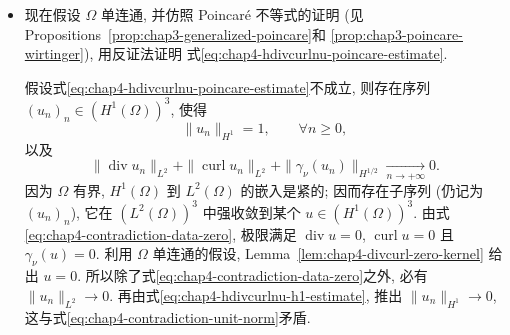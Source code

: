 \begin{Proof}
\begin{itemize}
\[\begin{aligned}
 -(\operatorname{div}\varphi)(\varphi\cdot\nu).
 \end{aligned}
 \]
 因为 $\varphi\in\mathcal H$, 知道 $\varphi\cdot\nu=0$ 于边界的一个邻域.
 所以上式最后两项消失, 由式\eqref{eq:chap4-gradient-curl-div-boundary}最终得到
 \begin{equation}
 \int_\Omega|\nabla\varphi|^2\,\mathrm dx
 =\int_\Omega\bigl(|\operatorname{curl}\varphi|^2+|\operatorname{div}\varphi|^2\bigr)\,\mathrm dx
 -\int_{\partial\Omega}((\varphi\cdot\nabla)\nu)\cdot\varphi\,\mathrm d\sigma.
 \label{eq:chap4-gradient-curl-div-identity}
 \end{equation}
 记该等式最后一项为 $I$; 它不含 $\varphi$ 的任何导数, 所以
 \[
  |I|\leq\operatorname{Lip}(\nu)\|\varphi\|_{L^2(\partial\Omega)}^2.
 \]
 由 Theorem~\ref{thm:chap3-boundary-sobolev-embedding} 中的迹不等式,
 \[
  \|\varphi\|_{L^2(\partial\Omega)}
  \leq C\|\varphi\|_{L^2}+C\|\varphi\|_{L^2}^{1/2}\|\nabla\varphi\|_{L^2}^{1/2}.
 \]
 再使用 Young 不等式 (见 Corollary~\ref{cor:chap2-young-epsilon}), 得到
 \[
  |I|\leq C_\varepsilon\|\varphi\|_{L^2}^2
  +\frac12\|\nabla\varphi\|_{L^2}^2.
 \]
 将这个估计用于式\eqref{eq:chap4-gradient-curl-div-identity}, 即得所需结论.

 \item 现在假设 $\Omega$ 单连通, 并仿照 Poincaré 不等式的证明
 (见 Propositions~\ref{prop:chap3-generalized-poincare}和
 \ref{prop:chap3-poincare-wirtinger}), 用反证法证明
 式\eqref{eq:chap4-hdivcurlnu-poincare-estimate}.

 假设式\eqref{eq:chap4-hdivcurlnu-poincare-estimate}不成立, 则存在序列
 $(u_n)_n\in(H^1(\Omega))^3$, 使得
 \begin{equation}
  \|u_n\|_{H^1}=1,\qquad\forall n\geq0,
  \label{eq:chap4-contradiction-unit-norm}
 \end{equation}
 以及
 \begin{equation}
  \|\operatorname{div}u_n\|_{L^2}+\|\operatorname{curl}u_n\|_{L^2}
  +\|\gamma_\nu(u_n)\|_{H^{1/2}}
  \underset{n\to+\infty}{\longrightarrow}0.
  \label{eq:chap4-contradiction-data-zero}
 \end{equation}
 因为 $\Omega$ 有界, $H^1(\Omega)$ 到 $L^2(\Omega)$ 的嵌入是紧的;
 因而存在子序列 (仍记为 $(u_n)_n$), 它在 $(L^2(\Omega))^3$ 中强收敛到某个
 $u\in(H^1(\Omega))^3$. 由式\eqref{eq:chap4-contradiction-data-zero}, 极限满足
 $\operatorname{div}u=0$, $\operatorname{curl}u=0$ 且 $\gamma_\nu(u)=0$.
 利用 $\Omega$ 单连通的假设, Lemma~\ref{lem:chap4-divcurl-zero-kernel} 给出 $u=0$.
 所以除了式\eqref{eq:chap4-contradiction-data-zero}之外, 必有
 $\|u_n\|_{L^2}\to0$. 再由式\eqref{eq:chap4-hdivcurlnu-h1-estimate}, 推出
 $\|u_n\|_{H^1}\to0$, 这与式\eqref{eq:chap4-contradiction-unit-norm}矛盾.
\end{itemize}
\end{Proof}

